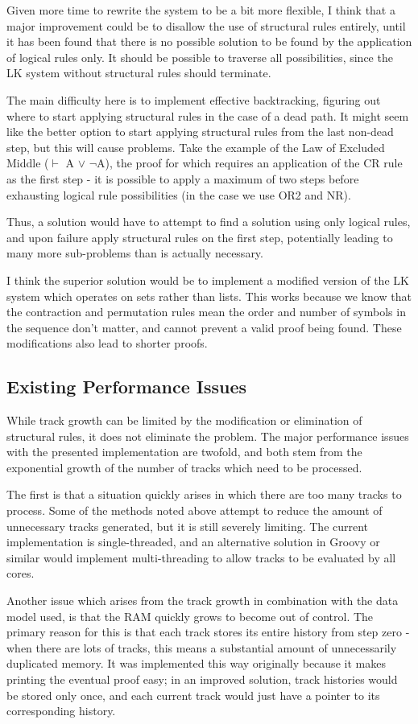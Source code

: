 \documentclass{article}
\begin{document}
Given more time to rewrite the system to be a bit more flexible, I think that a
major improvement could be to disallow the use of structural rules entirely,
until it has been found that there is no possible solution to be found by the
application of logical rules only. It should be possible to traverse all
possibilities, since the LK system without structural rules should terminate.

The main difficulty here is to implement
effective backtracking, figuring out where to start applying structural rules
in the case of a dead path. It might seem like the better option to start
applying structural rules from the last non-dead step, but this will cause
problems. Take the example of the Law of Excluded Middle
($\vdash$ A $\vee$ $\neg$A), the proof for which requires an application of the
CR rule as the first step - it is possible to apply a maximum of two steps
before exhausting logical rule possibilities (in the case we use OR2 and NR).

Thus, a solution would have to attempt to find a solution using only logical
rules, and upon failure apply structural rules on the first step, potentially
leading to many more sub-problems than is actually necessary.

I think the superior solution would be to implement a modified version of the LK
system which operates on sets rather than lists. This works because we know
that the contraction and permutation rules mean the order and number of symbols
in the sequence don't matter, and cannot prevent a valid proof being found.
These modifications also lead to shorter proofs.

\subsection{Existing Performance Issues}

While track growth can be limited by the modification or elimination of
structural rules, it does not eliminate the problem. The major performance 
issues with the presented implementation are twofold, and both stem from the 
exponential growth of the number of tracks which need to be processed.

The first is that a situation quickly arises in which there are too many tracks
to process. Some of the methods noted above attempt to reduce the amount of
unnecessary tracks generated, but it is still severely limiting. The current
implementation is single-threaded, and an alternative solution in Groovy or
similar would implement multi-threading to allow tracks to be evaluated by all
cores.

Another issue which arises from the track growth in combination with the data
model used, is that the RAM quickly grows to become out of control. The primary
reason for this is that each track stores its entire history from step zero -
when there are lots of tracks, this means a substantial amount of unnecessarily
duplicated memory. It was implemented this way originally because it makes 
printing the eventual proof easy; in an improved solution, track histories would
be stored only once, and each current track would just have a pointer to its
corresponding history.
\end{document}
